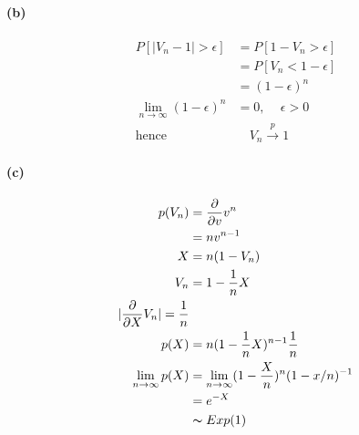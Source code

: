 \documentclass[11pt, letterpaper]{article}
\begin{document}
\paragraph{(b)}
\begin{align*}
    P[|V_n - 1| > \epsilon] &= P[1 - V_n > \epsilon] \\
        &= P[V_n < 1-\epsilon] \\
        &= (1-\epsilon)^n \\
    \lim_{n \rightarrow \infty} (1-\epsilon)^n &= 0, \,\quad \epsilon > 0 \\
    \text{hence} &\quad V_n \xrightarrow{p} 1
\end{align*}

\paragraph{(c)}
\begin{align*}
    p(V_n) &= \frac{\partial}{\partial v} v^n \\
        &= n v^{n-1} \\
    X &= n(1-V_n) \\
    V_n &= 1 - \frac{1}{n}X \\
    |\frac{\partial}{\partial X} V_n| = \frac{1}{n} \\
    p(X) &= n(1-\frac{1}{n}X)^{n-1}\frac{1}{n} \\
    \lim_{n \rightarrow \infty} p(X) &= \lim_{n \rightarrow \infty} (1-\frac{X}{n})^n (1-x/n)^{-1} \\
        &= e^{-X} \\
        &\thicksim Exp(1)
\end{align*}
\end{document}
